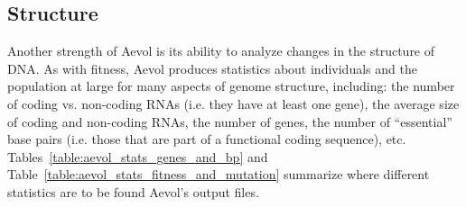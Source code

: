 \subsection{Structure}
Another strength of Aevol is its ability to analyze changes in the structure of DNA. As with fitness, Aevol produces statistics about individuals and the population at large for many aspects of genome structure, including: the number of coding vs. non-coding RNAs (i.e. they have at least one gene), the average size of coding and non-coding RNAs, the number of genes, the number of ``essential'' base pairs (i.e. those that are part of a functional coding sequence), etc. Tables~\ref{table:aevol_stats_genes_and_bp} and Table~\ref{table:aevol_stats_fitness_and_mutation} summarize where different statistics are to be found Aevol's output files. 

